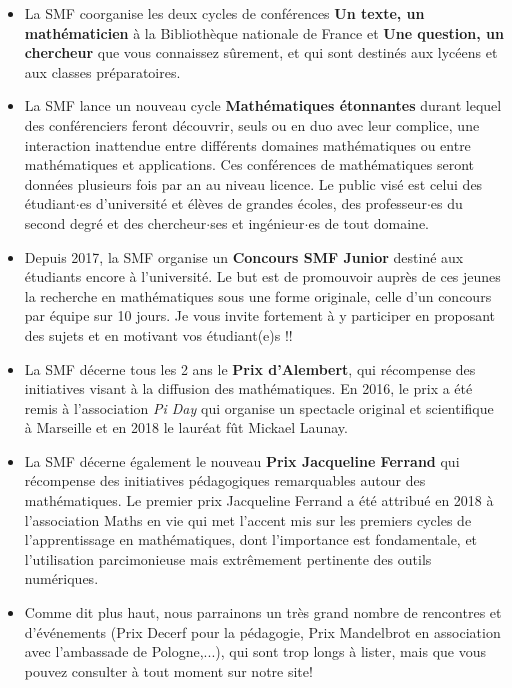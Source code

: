 \begin{itemize}
 \item
 La SMF coorganise les deux cycles de conf\'erences
{\bf Un texte, un math\'ematicien}   \`a la Biblioth\`{e}que nationale de France  et {\bf Une question, un chercheur} que vous connaissez s\^urement, et qui sont destin\'es aux lyc\'eens et aux classes pr\'eparatoires.
\item
La SMF lance un nouveau cycle {\bf Math\'ematiques \'etonnantes} durant lequel des conf\'erenciers feront d\'ecouvrir, seuls ou en duo avec leur complice, une interaction inattendue entre diff\'erents domaines math\'ematiques ou entre math\'ematiques et applications. Ces conf\'erences de math\'ematiques seront donn\'ees plusieurs fois par an au niveau licence. Le public vis\'e est celui des \'etudiant$\cdot$es d'universit\'e et \'el\`eves de grandes \'ecoles, des professeur$\cdot$es du second degr\'e et des chercheur$\cdot$ses et ing\'enieur$\cdot$es de tout domaine.

\item
Depuis 2017, la SMF organise un {\bf Concours SMF Junior} destin\'e aux \'etudiants encore \`a l'universit\'e. Le but est de promouvoir aupr\`es de ces jeunes la recherche en math\'ematiques sous une forme originale, celle d'un concours par \'equipe sur 10 jours. Je vous invite fortement \`a y participer en proposant des sujets et en motivant vos \'etudiant(e)s !!

\item
La SMF d\'ecerne tous les 2 ans le {\bf Prix d'Alembert}, qui r\'ecompense des initiatives visant \`a la diffusion des math\'ematiques. En 2016, le prix a \'et\'e remis \`a l'association {\em Pi Day} qui organise un spectacle original et scientifique \`a Marseille et en 2018 le laur\'eat f\^ut Mickael Launay.

\item 
La SMF d\'ecerne \'egalement le nouveau {\bf Prix Jacqueline Ferrand} qui r\'ecompense des initiatives p\'edagogiques remarquables autour des math\'ematiques. Le	premier prix Jacqueline Ferrand a \'et\'e attribu\'e en 2018 \`a l’association Maths en vie qui met l’accent mis sur les premiers cycles de l’apprentissage en math\'ematiques, dont l’importance est fondamentale, et l’utilisation parcimonieuse mais extr\^emement pertinente des outils num\'eriques. 

\item
Comme dit plus haut, nous parrainons un tr\`es grand nombre de rencontres et d'\'ev\'enements (Prix Decerf pour la p\'edagogie, Prix Mandelbrot en association avec l'ambassade de Pologne,...), qui sont trop longs \`a lister, mais que vous pouvez consulter \`a tout moment sur notre site!

\end{itemize}


